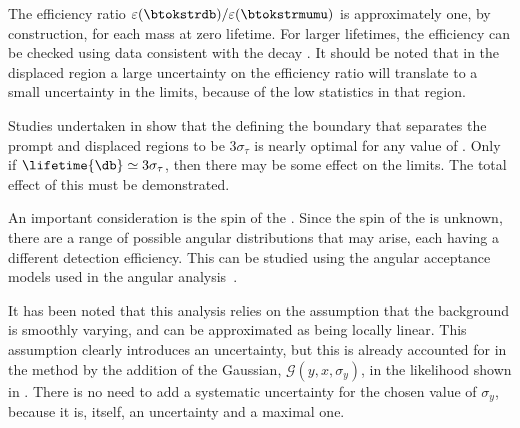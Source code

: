 The efficiency ratio $\varepsilon(\btokstrdb)/\varepsilon(\btokstrmumu)$ is approximately one, by
construction, for each mass at zero lifetime.
For larger lifetimes, the efficiency can be checked using data consistent with the decay
\decay{\Bd}{\jpsi\KS}.
It should be noted that in the displaced region a large uncertainty on the efficiency ratio will
translate to a small uncertainty in the limits, because of the low statistics in that region.



Studies undertaken in  show that the defining the boundary that separates
the prompt and displaced regions to be $3\sigma_\tau$ is nearly optimal for any value of
\lifetime{\db}.
Only if $\lifetime{\db}\simeq3\sigma_\tau$, then there may be some effect on the limits.
The total effect of this must be demonstrated.

An important consideration is the spin of the \db.
Since the spin of the \db is unknown, there are a range of possible angular distributions that may
arise, each having a different detection efficiency.
This can be studied using the angular acceptance models used in the \btokstrmumu angular
analysis~\cite{LHCb-CONF-2015-002}.
%

It has been noted that this analysis relies on the assumption that the background is smoothly
varying, and can be approximated as being locally linear.
This assumption clearly introduces an uncertainty, but this is already accounted for in the method
by the addition of the Gaussian, $\mathcal{G}(y, x, \sigma_y)$, in the likelihood shown in
.
There is no need to add a systematic uncertainty for the chosen value of $\sigma_y$, because it is,
itself, an uncertainty and a maximal one.










